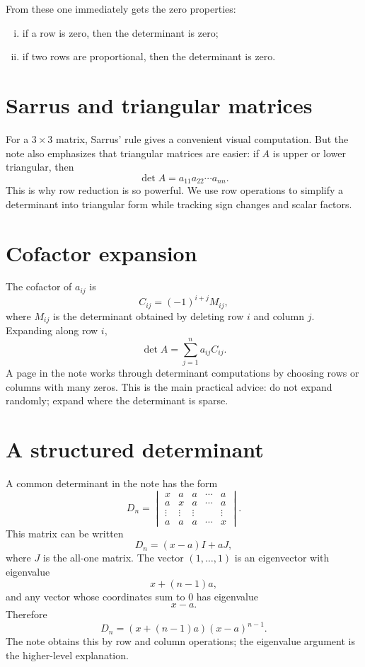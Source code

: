From these one immediately gets the zero properties:
\begin{enumerate}[(i)]
  \item if a row is zero, then the determinant is zero;
  \item if two rows are proportional, then the determinant is zero.

\end{enumerate}

\section{Sarrus and triangular matrices}

For a \(3\times3\) matrix, Sarrus' rule gives a convenient visual computation.  But the note also emphasizes that triangular matrices are easier: if \(A\) is upper or lower triangular, then
\[
  \det A=a_{11}a_{22}\cdots a_{nn}.
\]
This is why row reduction is so powerful.  We use row operations to simplify a determinant into triangular form while tracking sign changes and scalar factors.

\section{Cofactor expansion}

The cofactor of \(a_{ij}\) is
\[
  C_{ij}=(-1)^{i+j}M_{ij},
\]
where \(M_{ij}\) is the determinant obtained by deleting row \(i\) and column \(j\).  Expanding along row \(i\),
\[
  \det A=\sum_{j=1}^n a_{ij}C_{ij}.
\]
A page in the note works through determinant computations by choosing rows or columns with many zeros.  This is the main practical advice: do not expand randomly; expand where the determinant is sparse.

\section{A structured determinant}

A common determinant in the note has the form
\[
  D_n=\begin{vmatrix}
  x&a&a&\cdots&a\\
  a&x&a&\cdots&a\\
  \vdots&\vdots&\vdots&&\vdots\\
  a&a&a&\cdots&x
  \end{vmatrix}.
\]
This matrix can be written
\[
  D_n=(x-a)I+aJ,
\]
where \(J\) is the all-one matrix.  The vector \((1,\ldots,1)\) is an eigenvector with eigenvalue
\[
  x+(n-1)a,
\]
and any vector whose coordinates sum to \(0\) has eigenvalue
\[
  x-a.
\]
Therefore
\[
  D_n=(x+(n-1)a)(x-a)^{n-1}.
\]
The note obtains this by row and column operations; the eigenvalue argument is the higher-level explanation.


